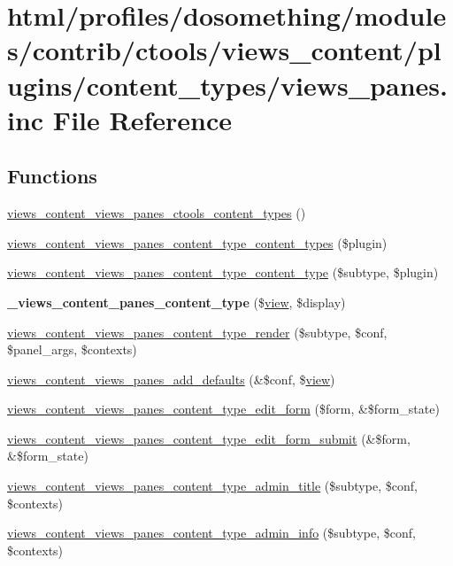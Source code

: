 \hypertarget{views__panes_8inc}{
\section{html/profiles/dosomething/modules/contrib/ctools/views\_\-content/plugins/content\_\-types/views\_\-panes.inc File Reference}
\label{views__panes_8inc}
}
\subsection*{Functions}
\begin{DoxyCompactItemize}
\item 
\hyperlink{views__panes_8inc_a47ae37922a47cd0ce4389ef3ff4dcf13}{views\_\-content\_\-views\_\-panes\_\-ctools\_\-content\_\-types} ()
\item 
\hyperlink{views__panes_8inc_a27dc273e61036885ab806b283debd0ff}{views\_\-content\_\-views\_\-panes\_\-content\_\-type\_\-content\_\-types} (\$plugin)
\item 
\hyperlink{views__panes_8inc_a574f8e1390e8933ff0d788df01b7347a}{views\_\-content\_\-views\_\-panes\_\-content\_\-type\_\-content\_\-type} (\$subtype, \$plugin)
\item 
\hypertarget{views__panes_8inc_acb89daa3d309b045920f1dd9aaaf30cb}{
{\bfseries \_\-views\_\-content\_\-panes\_\-content\_\-type} (\$\hyperlink{classview}{view}, \$display)}
\label{views__panes_8inc_acb89daa3d309b045920f1dd9aaaf30cb}

\item 
\hyperlink{views__panes_8inc_ae1fe2dcd3a3ee733e44ead83786d3870}{views\_\-content\_\-views\_\-panes\_\-content\_\-type\_\-render} (\$subtype, \$conf, \$panel\_\-args, \$contexts)
\item 
\hyperlink{views__panes_8inc_a8c66441e03f6ca1eb97b2ff4eda629b1}{views\_\-content\_\-views\_\-panes\_\-add\_\-defaults} (\&\$conf, \$\hyperlink{classview}{view})
\item 
\hyperlink{views__panes_8inc_ac86eb41504d821a677f83530dcd07119}{views\_\-content\_\-views\_\-panes\_\-content\_\-type\_\-edit\_\-form} (\$form, \&\$form\_\-state)
\item 
\hyperlink{views__panes_8inc_a08909edfae5e99b7b41c01c053f117f8}{views\_\-content\_\-views\_\-panes\_\-content\_\-type\_\-edit\_\-form\_\-submit} (\&\$form, \&\$form\_\-state)
\item 
\hyperlink{views__panes_8inc_a9f812dd75c492c5947dcb4409d2b1651}{views\_\-content\_\-views\_\-panes\_\-content\_\-type\_\-admin\_\-title} (\$subtype, \$conf, \$contexts)
\item 
\hyperlink{views__panes_8inc_a195ec7b84cf3cbca102ed50bf78949d7}{views\_\-content\_\-views\_\-panes\_\-content\_\-type\_\-admin\_\-info} (\$subtype, \$conf, \$contexts)
\end{DoxyCompactItemize}



